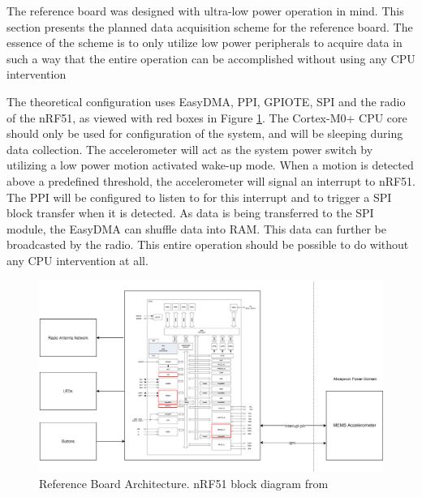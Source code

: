 The reference board was designed with ultra-low power operation in mind. This section presents the planned data acquisition scheme for the reference board. The essence of the scheme is to only utilize low power peripherals to acquire data in such a way that the entire operation can be accomplished without using any CPU intervention  

The theoretical configuration uses EasyDMA, PPI, GPIOTE, SPI and the radio of the nRF51, as viewed with red boxes in Figure \ref{fig:nrf51}. The Cortex-M0+ CPU core should only be used for configuration of the system, and will be sleeping during data collection. The accelerometer will act as the system power switch by utilizing a low power motion activated wake-up mode. When a motion is detected above a predefined threshold, the accelerometer will signal an interrupt to nRF51. The PPI will be configured to listen to for this interrupt and to trigger a SPI block transfer when it is detected. As data is being transferred to the SPI module, the EasyDMA can shuffle data into RAM. This data can further be broadcasted by the radio. This entire operation should be possible to do without any CPU intervention at all.

\begin{figure}[h]
\centering
\includegraphics[scale=0.44]{fig/sys_arch.png}
\caption{Reference Board Architecture. nRF51 block diagram from \cite{nrf51}}
\label{fig:nrf51}
\end{figure}